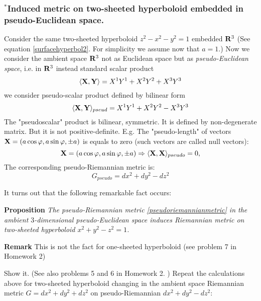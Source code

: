\documentclass[12pt]{article}
\theoremstyle{theorem}
\numberwithin{equation}{section}
\begin{document}
  \subsubsection {$^*$Induced metric on two-sheeted hyperboloid embedded in pseudo-Euclidean space.}

{\small
   Consider the same two-sheeted hyperboloid $z^2-x^2-y^2=1$
   embedded ${\bf R}^3$ (See equation \eqref{surfacehyperbol2}.
   For simplicity we assume now that $a=1$.) Now we consider the ambient space
   ${\bf R}^3$ not as Euclidean space
   but as {\it pseudo-Euclidean space},
   i.e. in ${\bf R}^3$ instead standard scalar product
      $$
      \langle{\bf X},{\bf Y}\rangle= X^1Y^1+X^2Y^2+X^3Y^3
      $$
   we consider pseudo-scalar product defined by
   bilinear form
   \begin{equation*}\label{pseudoscalar produc}
    \langle{\bf X},{\bf Y}\rangle_{pseud}= X^1Y^1+X^2Y^2-X^3Y^3
   \end{equation*}
 The "pseudoscalar" product is bilinear, symmetric. It is defined by non-degenerate matrix.
  But it is not positive-definite. E.g.  The "pseudo-length"
  of vectors ${\bf X}=(a\cos\varphi,a\sin\varphi,\pm a)$ is equals to zero (such vectors are called null vectors):
       \begin{equation*}\label{pseudolength}
     {\bf X}=(a\cos\varphi,a\sin\varphi,\pm a)\Rightarrow   \langle{\bf X},{\bf X}\rangle_{pseudo}=0,
       \end{equation*}
The corresponding pseudo-Riemannian metric is:
              \begin{equation}\label{pseudoriemannianmetric}
                G_{pseudo}=dx^2+dy^2-dz^2
              \end{equation}



It turns out that the  following remarkable fact occurs:

 {\bf Proposition} {\it The pseudo-Riemannian metric \eqref{pseudoriemannianmetric} in the ambient $3$-dimensional
 pseudo-Euclidean space induces Riemannian metric on two-sheeted hyperboloid $x^2+y^2-z^2=1$.}



{\bf Remark} This is not the fact for one-sheeted hyperboloid (see problem 7 in Homework 2)

 Show it. (See also problems 5 and 6 in Homework 2. )
 Repeat the calculations above for two-sheeted hyperboloid changing in the ambient space
 Riemannian metric $G=dx^2+dy^2+dz^2$ on pseudo-Riemannian $dx^2+dy^2-dz^2$:

\m


}
\end{document}
